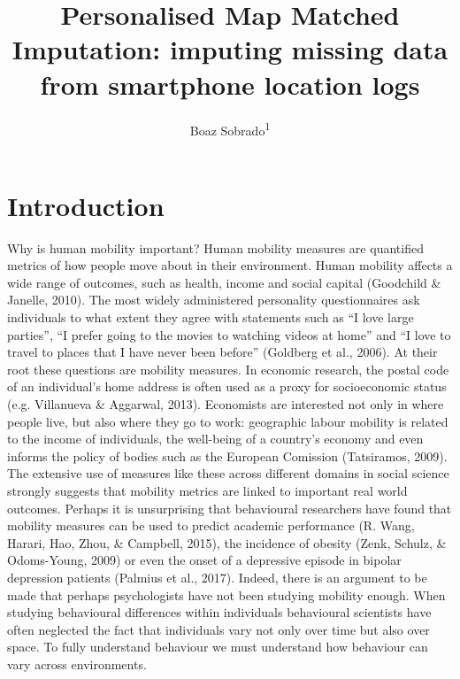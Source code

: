 \documentclass[man]{apa6}
\title{Personalised Map Matched Imputation: imputing missing data from
smartphone location logs}
\author{Boaz Sobrado\textsuperscript{1}}
\affiliation{
    \vspace{0.5cm}
          \textsuperscript{1} Utrecht University  }
\theoremstyle{definition}
\theoremstyle{definition}
\theoremstyle{definition}
\theoremstyle{remark}
\begin{document}
\maketitle

\setcounter{secnumdepth}{0}



\section{Introduction}\label{introduction}

Why is human mobility important? Human mobility measures are quantified
metrics of how people move about in their environment. Human mobility
affects a wide range of outcomes, such as health, income and social
capital (Goodchild \& Janelle, 2010). The most widely administered
personality questionnaires ask individuals to what extent they agree
with statements such as \enquote{I love large parties}, \enquote{I
prefer going to the movies to watching videos at home} and \enquote{I
love to travel to places that I have never been before} (Goldberg et
al., 2006). At their root these questions are mobility measures. In
economic research, the postal code of an individual's home address is
often used as a proxy for socioeconomic status (e.g. Villanueva \&
Aggarwal, 2013). Economists are interested not only in where people
live, but also where they go to work: geographic labour mobility is
related to the income of individuals, the well-being of a country's
economy and even informs the policy of bodies such as the European
Comission (Tatsiramos, 2009). The extensive use of measures like these
across different domains in social science strongly suggests that
mobility metrics are linked to important real world outcomes. Perhaps it
is unsurprising that behavioural researchers have found that mobility
measures can be used to predict academic performance (R. Wang, Harari,
Hao, Zhou, \& Campbell, 2015), the incidence of obesity (Zenk, Schulz,
\& Odoms-Young, 2009) or even the onset of a depressive episode in
bipolar depression patients (Palmius et al., 2017). Indeed, there is an
argument to be made that perhaps psychologists have not been studying
mobility enough. When studying behavioural differences within
individuals behavioural scientists have often neglected the fact that
individuals vary not only over time but also over space. To fully
understand behaviour we must understand how behaviour can vary across
environments.
\end{document}
